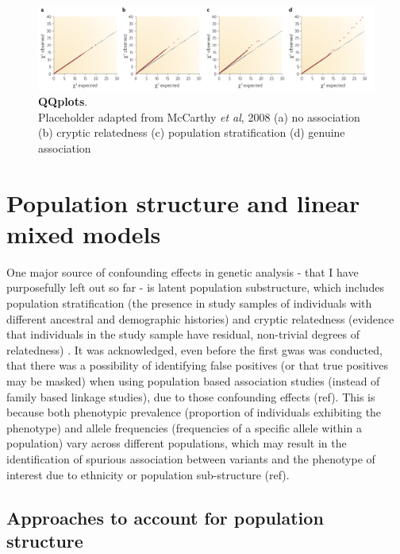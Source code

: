 \begin{figure}[h]
\centering
\includegraphics[width=15cm]{Chapter2/Fig/qqplots.png}
\caption[\textbf{QQplots}]{\textbf{QQplots}.\\
Placeholder adapted from McCarthy \textit{et al}, 2008
(a) no association (b) cryptic relatedness (c) population stratification (d) genuine association}
\label{fig:qqplots}
\end{figure}



\section{Population structure and linear mixed models}

One major source of confounding effects in genetic analysis - that I have purposefully left out so far -  is latent population substructure, which includes population stratification (the presence in study samples of individuals with different ancestral and demographic histories) and cryptic relatedness (evidence that individuals in the study sample have residual, non-trivial degrees of relatedness) \cite{mccarthy2008genome}.
It was acknowledged, even before the first \gls{gwas} was conducted, that there was a possibility of identifying false positives (or that true positives may be masked) when using population based association studies (instead of family based linkage studies), due to those confounding effects (ref). 
This is because both phenotypic prevalence (proportion of individuals exhibiting the phenotype) and allele frequencies (frequencies of a specific allele within a population) vary across different populations, which may result in the identification of spurious association between variants and the phenotype of interest due to ethnicity or population sub-structure (ref).


\subsection{Approaches to account for population structure}

